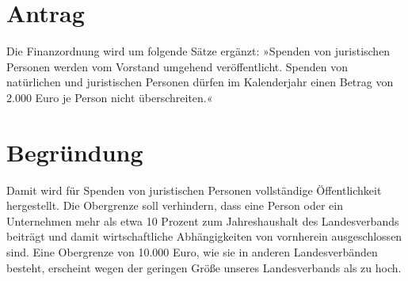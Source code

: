 \section{Antrag}

Die Finanzordnung wird um folgende Sätze ergänzt: »Spenden von juristischen Personen werden vom Vorstand umgehend veröffentlicht. Spenden von natürlichen und juristischen Personen dürfen im Kalenderjahr einen Betrag von 2.000 Euro je Person nicht überschreiten.«

\section{Begründung}

Damit wird für Spenden von juristischen Personen vollständige Öffentlichkeit hergestellt. Die Obergrenze soll verhindern, dass eine Person oder ein Unternehmen mehr als etwa 10 Prozent zum Jahreshaushalt des Landesverbands beiträgt und damit wirtschaftliche Abhängigkeiten von vornherein ausgeschlossen sind. Eine Obergrenze von 10.000 Euro, wie sie in anderen Landesverbänden besteht, erscheint wegen der geringen Größe unseres Landesverbands als zu hoch.
